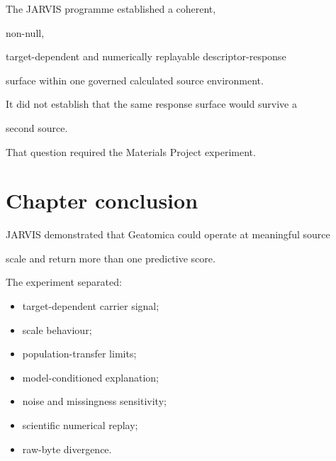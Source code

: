 \documentclass[11pt,a4paper,oneside]{report}
\begin{document}
\begin{claimboundary}



The JARVIS programme established a coherent,

non-null,

target-dependent and numerically replayable descriptor-response

surface within one governed calculated source environment.



It did not establish that the same response surface would survive a

second source.



That question required the Materials Project experiment.



\end{claimboundary}





\section{Chapter conclusion}



JARVIS demonstrated that Geatomica could operate at meaningful source

scale and return more than one predictive score.



The experiment separated:



\begin{itemize}



\item

target-dependent carrier signal;



\item

scale behaviour;



\item

population-transfer limits;



\item

model-conditioned explanation;



\item

noise and missingness sensitivity;



\item

scientific numerical replay;



\item

raw-byte divergence.



\end{itemize}
\end{document}
